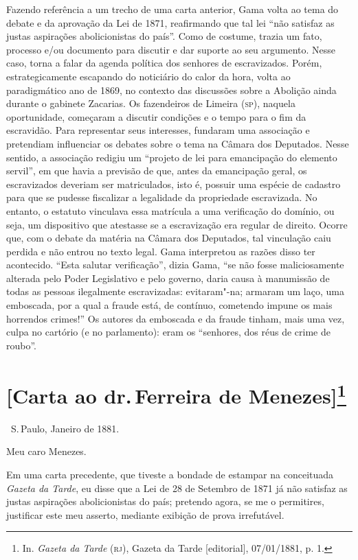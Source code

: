 {\small\noindent
Fazendo referência a um trecho de uma carta anterior, Gama volta
ao tema do debate e da aprovação da Lei de 1871, reafirmando que tal lei
``não satisfaz as justas aspirações abolicionistas do país''. Como de
costume, trazia um fato, processo e/ou documento para discutir e dar
suporte ao seu argumento. Nesse caso, torna a falar da agenda política
dos senhores de escravizados. Porém, estrategicamente escapando do
noticiário do calor da hora, volta ao paradigmático ano de 1869, no
contexto das discussões sobre a Abolição ainda durante o gabinete
Zacarias. Os fazendeiros de Limeira (\textsc{sp}), naquela oportunidade,
começaram a discutir condições e o tempo para o fim da escravidão. Para
representar seus interesses, fundaram uma associação e pretendiam
influenciar os debates sobre o tema na Câmara dos Deputados. Nesse
sentido, a associação redigiu um ``projeto de lei para emancipação do elemento
servil'', em que havia a previsão de que, antes da emancipação geral, os
escravizados deveriam ser matriculados, isto é, possuir uma espécie de
cadastro para que se pudesse fiscalizar a legalidade da propriedade
escravizada. No entanto, o estatuto vinculava essa matrícula a uma
verificação do domínio, ou seja, um dispositivo que atestasse se a
escravização era regular de direito. Ocorre que, com o debate da matéria
na Câmara dos Deputados, tal vinculação caiu perdida e não entrou no
texto legal. Gama interpretou as razões disso ter acontecido. ``Esta
salutar verificação'', dizia Gama, ``se não fosse maliciosamente alterada
pelo Poder Legislativo e pelo governo, daria causa à manumissão de todas
as pessoas ilegalmente escravizadas: evitaram"-na; armaram um laço, uma
emboscada, por a qual a fraude está, de contínuo, cometendo impune os
mais horrendos crimes!'' Os autores da emboscada e da fraude tinham, mais
uma vez, culpa no cartório (e no parlamento): eram os ``senhores, dos
réus de crime de roubo''.}

\chapter{{[}Carta ao dr.\,Ferreira de Menezes{]}\footnote[*]{In.
  \emph{Gazeta da Tarde} (\textsc{rj}), Gazeta da Tarde {[}editorial{]},
  07/01/1881, p. 1.}}

\hfill\ S.\,Paulo, Janeiro de 1881.\bigskip

\noindent{}Meu caro Menezes.\smallskip

Em uma carta precedente, que tiveste a bondade de estampar na
conceituada \emph{Gazeta da Tarde}, eu disse que a Lei de 28 de Setembro
de 1871 já não satisfaz as justas aspirações abolicionistas do país;
pretendo agora, se me o permitires, justificar este meu asserto,
mediante exibição de prova irrefutável.

